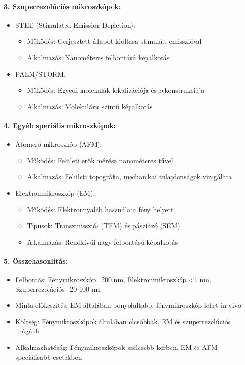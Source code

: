 \documentclass[a4paper,12pt]{article}
\begin{document}
\paragraph{3. Szuperrezolúciós mikroszkópok:} \begin{itemize} \item STED (Stimulated Emission Depletion): \begin{itemize} \item Működés: Gerjesztett állapot kioltása stimulált emisszióval \item Alkalmazás: Nanométeres felbontású képalkotás \end{itemize} \item PALM/STORM: \begin{itemize} \item Működés: Egyedi molekulák lokalizációja és rekonstrukciója \item Alkalmazás: Molekuláris szintű képalkotás \end{itemize} \end{itemize}

\paragraph{4. Egyéb speciális mikroszkópok:} \begin{itemize} \item Atomerő mikroszkóp (AFM): \begin{itemize} \item Működés: Felületi erők mérése nanométeres tűvel \item Alkalmazás: Felületi topográfia, mechanikai tulajdonságok vizsgálata \end{itemize} \item Elektronmikroszkóp (EM): \begin{itemize} \item Működés: Elektronnyaláb használata fény helyett \item Típusok: Transzmissziós (TEM) és pásztázó (SEM) \item Alkalmazás: Rendkívül nagy felbontású képalkotás \end{itemize} \end{itemize}

\paragraph{5. Összehasonlítás:} \begin{itemize} \item Felbontás: Fénymikroszkóp ~200 nm, Elektronmikroszkóp <1 nm, Szuperrezolúciós ~20-100 nm \item Minta előkészítés: EM általában bonyolultabb, fénymikroszkóp lehet in vivo \item Költség: Fénymikroszkópok általában olcsóbbak, EM és szuperrezolúciós drágább \item Alkalmazhatóság: Fénymikroszkópok szélesebb körben, EM és AFM speciálisabb esetekben \end{itemize}
\end{document}
